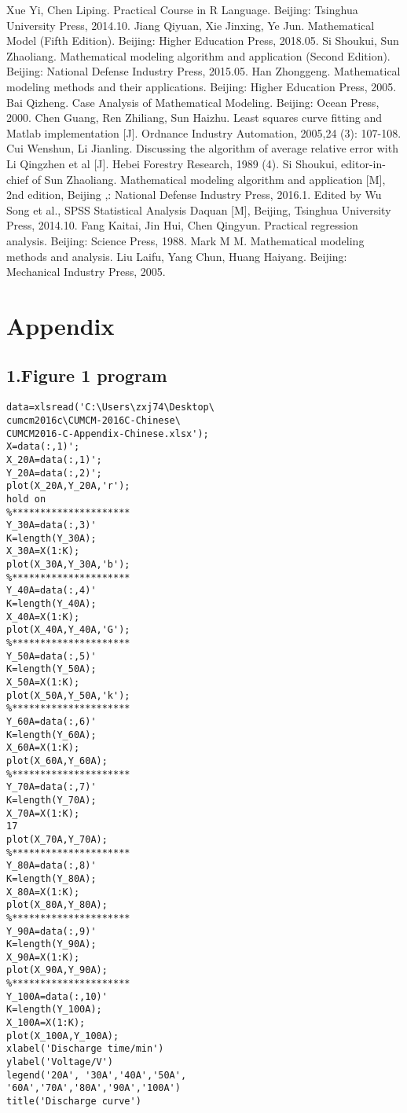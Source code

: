 \documentclass[conference]{IEEEtran}
\begin{document}
\begin{thebibliography}{00}
	 Xue Yi, Chen Liping. Practical Course in R Language. Beijing: Tsinghua University Press, 2014.10.
	 Jiang Qiyuan, Xie Jinxing, Ye Jun. Mathematical Model (Fifth Edition). Beijing: Higher Education Press, 2018.05.
	 Si Shoukui, Sun Zhaoliang. Mathematical modeling algorithm and application (Second Edition). Beijing: National Defense Industry Press, 2015.05.
	 Han Zhonggeng. Mathematical modeling methods and their applications. Beijing: Higher Education Press, 2005.
	 Bai Qizheng. Case Analysis of Mathematical Modeling. Beijing: Ocean Press, 2000.
	 Chen Guang, Ren Zhiliang, Sun Haizhu. Least squares curve fitting and Matlab implementation [J]. Ordnance Industry Automation, 2005,24 (3): 107-108.
	 Cui Wenshun, Li Jianling. Discussing the algorithm of average relative error with Li Qingzhen et al [J]. Hebei Forestry Research, 1989 (4).
	 Si Shoukui, editor-in-chief of Sun Zhaoliang. Mathematical modeling algorithm and application [M], 2nd edition, Beijing ,: National Defense Industry Press, 2016.1.
	 Edited by Wu Song et al., SPSS Statistical Analysis Daquan [M], Beijing, Tsinghua University Press, 2014.10.
	 Fang Kaitai, Jin Hui, Chen Qingyun. Practical regression analysis. Beijing: Science Press, 1988.
	 Mark M M. Mathematical modeling methods and analysis. Liu Laifu, Yang Chun, Huang Haiyang. Beijing: Mechanical Industry Press, 2005.
\end{thebibliography}

\section*{Appendix}
\subsection*{1.Figure 1 program}
\begin{lstlisting}
data=xlsread('C:\Users\zxj74\Desktop\
cumcm2016c\CUMCM-2016C-Chinese\
CUMCM2016-C-Appendix-Chinese.xlsx');
X=data(:,1)';
X_20A=data(:,1)';
Y_20A=data(:,2)';
plot(X_20A,Y_20A,'r');
hold on
%*********************
Y_30A=data(:,3)'
K=length(Y_30A);
X_30A=X(1:K);
plot(X_30A,Y_30A,'b');
%*********************
Y_40A=data(:,4)'
K=length(Y_40A);
X_40A=X(1:K);
plot(X_40A,Y_40A,'G');
%*********************
Y_50A=data(:,5)'
K=length(Y_50A);
X_50A=X(1:K);
plot(X_50A,Y_50A,'k');
%*********************
Y_60A=data(:,6)'
K=length(Y_60A);
X_60A=X(1:K);
plot(X_60A,Y_60A);
%*********************
Y_70A=data(:,7)'
K=length(Y_70A);
X_70A=X(1:K);
17
plot(X_70A,Y_70A);
%*********************
Y_80A=data(:,8)'
K=length(Y_80A);
X_80A=X(1:K);
plot(X_80A,Y_80A);
%*********************
Y_90A=data(:,9)'
K=length(Y_90A);
X_90A=X(1:K);
plot(X_90A,Y_90A);
%*********************
Y_100A=data(:,10)'
K=length(Y_100A);
X_100A=X(1:K);
plot(X_100A,Y_100A);
xlabel('Discharge time/min')
ylabel('Voltage/V')
legend('20A', '30A','40A','50A',
'60A','70A','80A','90A','100A')
title('Discharge curve')
\end{lstlisting}
\end{document}

